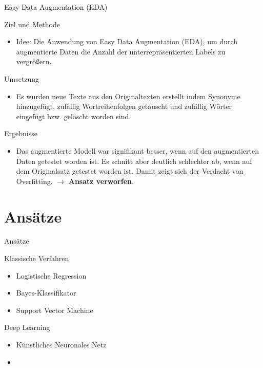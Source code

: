\documentclass[aspectratio=169]{beamer} %
\begin{document}
\begin{frame}{Easy Data Augmentation (EDA)}
    \begin{block}{Ziel und Methode}
        \begin{itemize} 
            \item Idee: Die Anwendung von Easy Data Augmentation (EDA), um durch augmentierte Daten die Anzahl der unterrepräsentierten Labels zu vergrößern.
        \end{itemize}
    \end{block}

    \begin{block}{Umsetzung}
        \begin{itemize}
            \item Es wurden neue Texte aus den Originaltexten erstellt indem Synonyme hinzugefügt, zufällig Wortreihenfolgen getauscht und zufällig Wörter eingefügt bzw. gelöscht worden sind. 
        \end{itemize}
    \end{block}

    \begin{block}{Ergebnisse}
        \begin{itemize}
            \item Das augmentierte Modell war signifikant besser, wenn auf den augmentierten Daten getestet worden ist. Es schnitt aber deutlich schlechter ab, wenn auf dem Originalsatz getestet worden ist. Damit zeigt sich der Verdacht von Overfitting. $\to$ \textbf{Ansatz verworfen}.
        \end{itemize}
    \end{block}
\end{frame}

\section{Ansätze}

\begin{frame}{Ansätze}
    \begin{block}{Klassische Verfahren}
        \begin{itemize}
            \item Logistische Regression
            \item Bayes-Klassifikator
            \item Support Vector Machine
        \end{itemize}
    \end{block}
    \begin{block}{Deep Learning}
        \begin{itemize}
            \item Künstliches Neuronales Netz
            \item {}
        \end{itemize}
    \end{block}
\end{frame}
\end{document}
